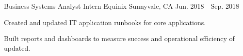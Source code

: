 \begin{cventries}
  \cventry
    {Business Systems Analyst Intern} %
    {Equinix} %
    {Sunnyvale, CA} %
    {Jun. 2018 - Sep. 2018} %
    {
      \begin{cvitems} %
        \item {Created and updated IT application runbooks for core applications.}
        \item {Built reports and dashboards to measure success and operational efficiency of updated.}
      \end{cvitems}
    }

\end{cventries}
